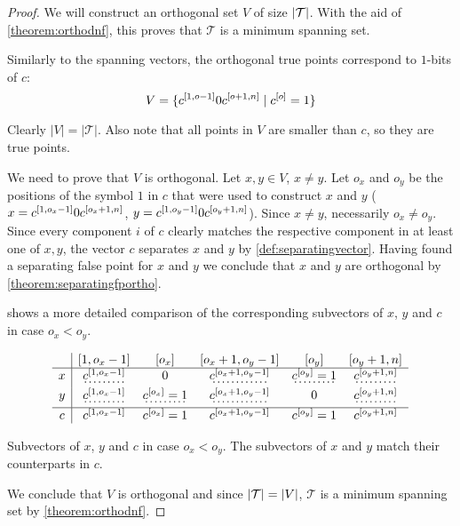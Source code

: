 \begin{proof}
We will construct an orthogonal set $V$
of size $\lvert\mathcal{T}\rvert$.
With the aid of \cref{theorem:orthodnf},
this proves that $\mathcal{T}$ is a minimum spanning set.

Similarly to the spanning vectors,
the orthogonal true points correspond to $1$-bits of $c$:
$$
V =
\{c^{[1, o - 1]} 0 c^{[o + 1, n]}
\mid c^{[o]} = 1\}
$$

Clearly $|V| = |\mathcal{T}|$.
Also note that all points in $V$ are smaller than $c$,
so they are true points.

We need to prove that $V$ is orthogonal.
Let $x, y \in V$, $x \neq y$.
Let $o_x$ and $o_y$ be the positions of the symbol $1$
in $c$
that were used to construct $x$ and $y$
($x = c^{[1, o_x - 1]} 0 c^{[o_x + 1, n]}$,
$y = c^{[1, o_y - 1]} 0 c^{[o_y + 1, n]}$).
Since $x \neq y$, necessarily $o_x \neq o_y$.
Since every component $i$ of $c$
clearly matches the respective component
in at least one of $x, y$,
the vector $c$ separates $x$ and $y$
by \cref{def:separatingvector}.
Having found a separating false point for $x$ and $y$
we conclude that $x$ and $y$ are orthogonal
by \cref{theorem:separatingfportho}.

shows a more detailed comparison
of the corresponding subvectors of $x$, $y$ and $c$
in case $o_x < o_y$.

\newcommand{\emphvector}[1]{\dotuline{#1}}

\begin{table}[h]
\centering
$$\begin{array}{c|ccccc}
& \interval{1}{o_x - 1} & [o_x]
& \interval{o_x + 1}{o_y - 1} & [o_y]
& \interval{o_y + 1}{n} \\
\hline
x
& \emphvector{\bits{c}{1}{o_x - 1}}
& 0
& \emphvector{\bits{c}{o_x + 1}{o_y - 1}}
& \emphvector{\bit{c}{o_y} = 1}
& \emphvector{\bits{c}{o_y + 1}{n}} \\
y
& \emphvector{\bits{c}{1}{o_x - 1}}
& \emphvector{\bit{c}{o_x} = 1}
& \emphvector{\bits{c}{o_x + 1}{o_y - 1}}
& 0
& \emphvector{\bits{c}{o_y + 1}{n}} \\
\hline
c
& \bits{c}{1}{o_x - 1}
& \bit{c}{o_x} = 1
& \bits{c}{o_x + 1}{o_y - 1}
& \bit{c}{o_y} = 1
& \bits{c}{o_y + 1}{n}
\end{array}$$
\caption[Subvectors of $x$, $y$ and $c$
in case $o_x < o_y$]
{Subvectors of $x$, $y$ and $c$
in case $o_x < o_y$.
The \emphvector{emphasized} subvectors of $x$ and $y$
match their counterparts in $c$.}
\label{tab:xyc}
\end{table}


We conclude that $V$ is orthogonal
and since $\lvert\mathcal{T}\rvert = \lvert V\rvert$,
$\mathcal{T}$ is a minimum spanning set
by \cref{theorem:orthodnf}.
\end{proof}

